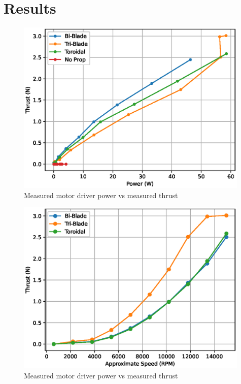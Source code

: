 \documentclass[8pt]{article}
\begin{document}
\section{Results}

\begin{figure}[H]
    \centering
    \includegraphics[width=0.99\textwidth]{power_vs_thrust.eps}
    \caption{Measured motor driver power vs measured thrust}
    \label{fig:power_vs_thrust}
\end{figure}

\begin{figure}[H]
    \centering
    \includegraphics[width=0.99\textwidth]{speed_vs_thrust.eps}
    \caption{Measured motor driver power vs measured thrust}
    \label{fig:speed_vs_thrust}
\end{figure}
\end{document}
